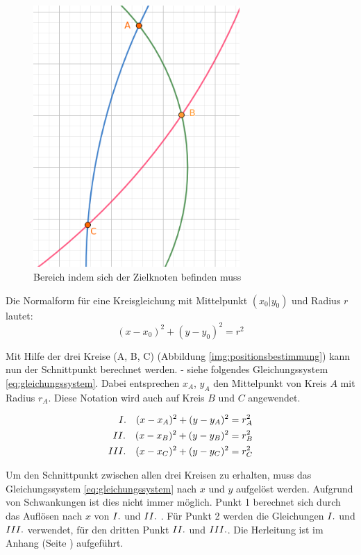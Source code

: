 \begin{figure}[H]
        \centering
        \includegraphics[width=0.7\textwidth]{images/positionsbestimmung_flaeche.png}
        \caption{Bereich indem sich der Zielknoten befinden muss}
        \label{img:schwankungen}
\end{figure}

Die Normalform für eine Kreisgleichung mit Mittelpunkt $(x_{0}|y_{0})$ und Radius $r$ lautet:
\begin{equation}
(x-x_{0})^{2}+(y-y_{0})^{2} = r^{2}
\end{equation}

Mit Hilfe der drei Kreise (A, B, C) (Abbildung \ref{img:positionsbestimmung}) kann nun der Schnittpunkt berechnet werden. - siehe folgendes Gleichungssystem \ref{eq:gleichungssystem}. Dabei entsprechen $x_{A}$, $y_{A}$ den Mittelpunkt von Kreis $A$ mit Radius $r_{A}$. Diese Notation wird auch auf Kreis $B$ und $C$ angewendet.

\begin{equation} \label{eq:gleichungssystem}
\begin{split}
\RM{1} \quad (x-x_{A})^{2}+(y-y_{A})^{2} &= r_{A}^{2} \\
\RM{2} \quad (x-x_{B})^{2}+(y-y_{B})^{2} &= r_{B}^{2} \\
\RM{3} \quad (x-x_{C})^{2}+(y-y_{C})^{2} &= r_{C}^{2}
\end{split}
\end{equation}

Um den Schnittpunkt zwischen allen drei Kreisen zu erhalten, muss das Gleichungssystem \ref{eq:gleichungssystem} nach $x$ und $y$ aufgelöst werden. Aufgrund von Schwankungen ist dies nicht immer möglich. Punkt \si{1} berechnet sich durch das Auflösen nach $x$ von $\RM{1}$ und $\RM{2}$ . Für Punkt \si{2} werden die Gleichungen $\RM{1}$ und $\RM{3}$ verwendet, für den dritten Punkt $\RM{2}$ und $\RM{3}$. Die Herleitung ist im Anhang (Seite \pageref{sec:abcdef}) aufgeführt.

